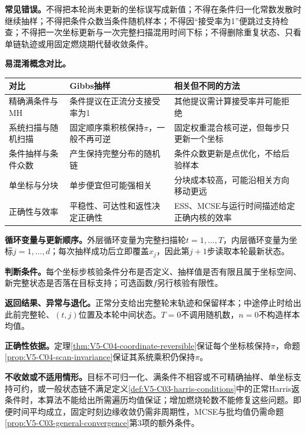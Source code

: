 \label{struct:V5-C04-CH30}
\textbf{常见错误。}不得把本轮尚未更新的坐标误写成新值；不得在条件归一化常数发散时继续抽样；不得把条件众数当条件随机样本；不得因“接受率为1”便跳过支持检查；不得把一次坐标更新与一次完整扫描混用时间下标；不得删除重复状态、只看单链轨迹或用固定燃烧期代替收敛条件。

\label{struct:V5-C04-CH31}
\textbf{易混淆概念对比。}
\begin{center}
\small
\renewcommand{\arraystretch}{1.60}
\begin{tabularx}{\linewidth}{@{}l X X@{}}
\toprule 对比 & Gibbs抽样 & 相关但不同的方法\\ \midrule
精确满条件与MH & 条件提议在正流分支接受率为1 & 其他提议需计算接受率并可能拒绝\\
系统扫描与随机扫描 & 固定顺序乘积核保持$\pi$，一般不再可逆 & 固定权重混合核可逆，但每步只更新一个坐标\\
条件抽样与条件众数 & 产生保持完整分布的随机链 & 条件众数更新是点优化，不给后验样本\\
单坐标与分块 & 单步便宜但可能强相关 & 分块成本较高，可能沿相关方向移动更远\\
正确性与效率 & 平稳性、可达性和返性决定正确性 & ESS、MCSE与运行时间描述给定正确内核的效率\\
\bottomrule
\end{tabularx}
\end{center}

\textbf{循环变量与更新顺序。}外层循环变量为完整扫描轮$t=1,\ldots,T$，内层循环变量为坐标$j=1,\ldots,d$；每次抽样成功后立即覆盖$x_j$，因此第$j+1$步读取本轮最新状态。

\textbf{判断条件。}每个坐标步核验条件分布是否定义、抽样值是否有限且属于坐标空间、新完整状态是否落在目标支持；可选函数$f$另行核验有限性。

\textbf{返回结果、异常与退化。}正常分支给出完整轮末轨迹和保留样本；中途停止时给出此前完整轮、$(t,j)$位置及本轮中间状态。$T=0$不调用随机数，$n=0$不构造样本均值。

\textbf{正确性依据。}定理\ref{thm:V5-C04-coordinate-reversible}保证每个坐标核保持$\pi$，命题\ref{prop:V5-C04-scan-invariance}保证其系统乘积仍保持$\pi$。

\textbf{不收敛或不适用情形。}目标不可归一化、满条件不相容或不可精确抽样、单坐标支持可约，或一般状态链不满足定义\ref{def:V5-C03-harris-conditions}中的正常Harris返条件时，本算法不能给出所需遍历均值保证；增加燃烧轮数不能修复这些问题。即便时间平均成立，固定时刻边缘收敛仍需非周期性，MCSE与批均值仍需命题\ref{prop:V5-C03-general-convergence}第3项的额外条件。

